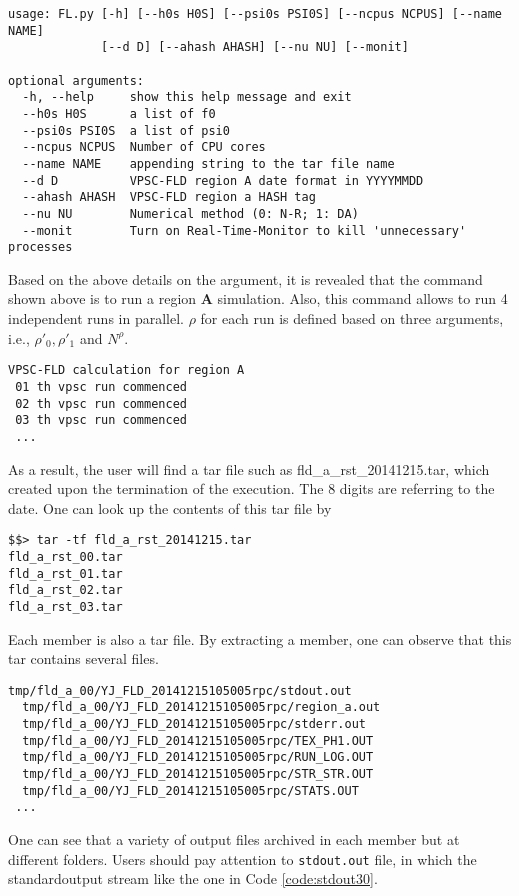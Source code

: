\documentclass[12pt]{amsart}
\begin{document}
\begin{lstlisting}[style=sh, caption=Block of FLb.sh]
usage: FL.py [-h] [--h0s H0S] [--psi0s PSI0S] [--ncpus NCPUS] [--name NAME]
             [--d D] [--ahash AHASH] [--nu NU] [--monit]

optional arguments:
  -h, --help     show this help message and exit
  --h0s H0S      a list of f0
  --psi0s PSI0S  a list of psi0
  --ncpus NCPUS  Number of CPU cores
  --name NAME    appending string to the tar file name
  --d D          VPSC-FLD region A date format in YYYYMMDD
  --ahash AHASH  VPSC-FLD region a HASH tag
  --nu NU        Numerical method (0: N-R; 1: DA)
  --monit        Turn on Real-Time-Monitor to kill 'unnecessary' processes
\end{lstlisting}

Based on the above details on the argument, it is revealed that the command shown above is to run a region \textbf{A} simulation.
Also, this command allows to run 4 independent runs in parallel.
$\rho$ for each run is defined based on three arguments, i.e., $\rho'_0, \rho'_1$ and $N^\rho$.
\begin{lstlisting}[style=sh, caption=An example command for parallel run for region A using FLD.py]
VPSC-FLD calculation for region A
 01 th vpsc run commenced
 02 th vpsc run commenced
 03 th vpsc run commenced
 ...
\end{lstlisting}
As a result, the user will find a tar file such as fld\_a\_rst\_20141215.tar, which created upon the termination of the execution.
The 8 digits are referring to the date.
One can look up the contents of this tar file by
\begin{lstlisting}[style=sh, caption=Contents of the fld\_a\_rst\_20141215.tar]
$$> tar -tf fld_a_rst_20141215.tar
fld_a_rst_00.tar
fld_a_rst_01.tar
fld_a_rst_02.tar
fld_a_rst_03.tar
\end{lstlisting}
Each member is also a tar file.
By extracting a member, one can observe that this tar contains several files.
\begin{lstlisting}[style=sh, caption=Contents of region\_a\_rst\_00.tar]
  tmp/fld_a_00/YJ_FLD_20141215105005rpc/stdout.out
  tmp/fld_a_00/YJ_FLD_20141215105005rpc/region_a.out
  tmp/fld_a_00/YJ_FLD_20141215105005rpc/stderr.out
  tmp/fld_a_00/YJ_FLD_20141215105005rpc/TEX_PH1.OUT
  tmp/fld_a_00/YJ_FLD_20141215105005rpc/RUN_LOG.OUT
  tmp/fld_a_00/YJ_FLD_20141215105005rpc/STR_STR.OUT
  tmp/fld_a_00/YJ_FLD_20141215105005rpc/STATS.OUT
 ...
\end{lstlisting}
One can see that a variety of output files archived in each member but at different folders.
Users should pay attention to \verb$stdout.out$ file, in which the standardoutput stream like the one in Code \ref{code:stdout30}.
\end{document}
